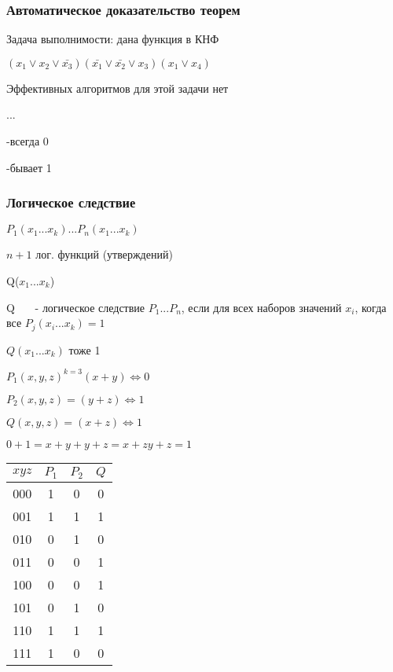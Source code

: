 \documentclass[russian]{lecture-notes}
\begin{document}
	\subsubsection{Автоматическое доказательство теорем}

	Задача выполнимости: дана функция в КНФ

	$(x_{1} \lor x_{2} \lor \bar{x_{3}})(\bar{x_{1}} \lor \bar{x_{2}} \lor x_{3})(x_{1} \lor x_{4})$

	Эффективных алгоритмов для этой задачи нет

	...

	-всегда 0

	-бывает 1

	\subsubsection{Логическое следствие}

	\begin{definition}
		$P_{1}(x_{1}...x_{k})...P_{n}(x_{1}...x_{k})$

		$n+1$ лог. функций (утверждений)

		Q($x_{1} ... x_{k}$)

		Q ~~~- логическое следствие $P_{1} ... P_{n}$, если для всех наборов значений $x_{i}$, когда все $P_{j}(x_{i}...x_{k}) = 1$

		$Q(x_{1}...x_{k})$ тоже 1

		\end{definition}


	\begin{example}
		$P_{1}(x,y,z)^{k=3} (x+y)\Leftrightarrow 0 $

		$P_{2}(x,y,z) = (y+z) \Leftrightarrow 1$

		$Q(x,y,z) = (x+z) \Leftrightarrow 1 $

		$0+1 = x+y+y+z=x+zy+z=1$


		\end{example}

	\begin{table}[h!]
	\begin{tabular}{|c|c|c|c|}
		\hline
		$xyz$ & $P_{1}$ & $P_{2}$ & $Q$\\ \hline
		000 & 1 & 0 & 0\\ \hline
		001 & 1 & 1 & 1\\ \hline
		010 & 0 & 1 & 0\\ \hline
		011 & 0 & 0 & 1 \\ \hline
		100 & 0 & 0 & 1 \\ \hline
		101 & 0 & 1 & 0 \\ \hline
		110 & 1 & 1 & 1 \\ \hline
		111 & 1 & 0 & 0 \\ \hline
\end{tabular}
\end{table}
\end{document}
